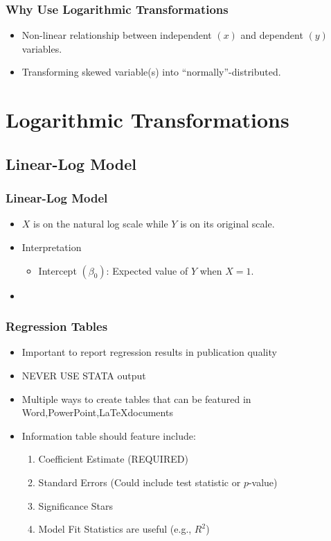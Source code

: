 \documentclass{beamer}
\begin{document}
\begin{frame}
	\frametitle{Why Use Logarithmic Transformations}
		\begin{itemize}
			\item Non-linear relationship between independent $(x)$ and dependent $(y)$ variables.
			\item Transforming skewed variable(s) into ``normally''-distributed.
		\end{itemize}
\end{frame}

\section{Logarithmic Transformations}

\subsection{Linear-Log Model}

\begin{frame}
	\frametitle{Linear-Log Model}
		\begin{itemize}
			\item $X$ is on the natural log scale while $Y$ is on its original scale.
			\item Interpretation
				\begin{itemize}
					\item Intercept $(\beta_{0})$: Expected value of $Y$ when $X=1$.
				\end{itemize}
			\item 
		\end{itemize}
\end{frame}

\begin{frame}
	\frametitle{Regression Tables}
		\begin{itemize}
			\item Important to report regression results in publication quality
			\item NEVER USE STATA output
			\item Multiple ways to create tables that can be featured in Word,PowerPoint,\LaTeX documents
			\item Information table should feature include:
				\begin{enumerate}
					\item Coefficient Estimate (REQUIRED)
					\item Standard Errors (Could include test statistic or $p$-value)
					\item Significance Stars
					\item Model Fit Statistics are useful (e.g., $R^2$)
				\end{enumerate}
		\end{itemize}
\end{frame}
\end{document}
